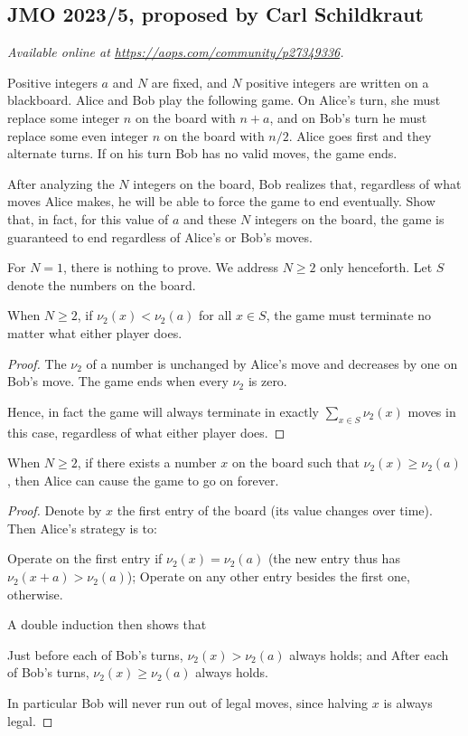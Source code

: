 \documentclass[11pt]{scrartcl}
\begin{document}
\subsection{JMO 2023/5, proposed by Carl Schildkraut}
\textsl{Available online at \url{https://aops.com/community/p27349336}.}
\begin{mdframed}[style=mdpurplebox,frametitle={Problem statement}]
Positive integers $a$ and $N$ are fixed,
and $N$ positive integers are written on a blackboard.
Alice and Bob play the following game.
On Alice's turn, she must replace some integer $n$ on the board with $n+a$,
and on Bob's turn he must replace some even integer $n$ on the board with $n/2$.
Alice goes first and they alternate turns.
If on his turn Bob has no valid moves, the game ends.

After analyzing the $N$ integers on the board, Bob realizes that,
regardless of what moves Alice makes,
he will be able to force the game to end eventually.
Show that, in fact, for this value of $a$ and these $N$ integers on the board,
the game is guaranteed to end regardless of Alice's or Bob's moves.
\end{mdframed}
For $N=1$, there is nothing to prove.
We address $N \ge 2$ only henceforth.
Let $S$ denote the numbers on the board.

\begin{claim*}
  When $N \ge 2$, if $\nu_2(x) < \nu_2(a)$ for all $x \in S$,
  the game must terminate no matter what either player does.
\end{claim*}
\begin{proof}
  The $\nu_2$ of a number is unchanged by Alice's move
  and decreases by one on Bob's move.
  The game ends when every $\nu_2$ is zero.

  Hence, in fact the game will always terminate in exactly
  $\sum_{x \in S} \nu_2(x)$ moves in this case,
  regardless of what either player does.
\end{proof}

\begin{claim*}
  When $N \ge 2$, if there exists a number $x$ on the board such that
  $\nu_2(x) \ge \nu_2(a)$, then Alice can cause the game to go on forever.
\end{claim*}
\begin{proof}
  Denote by $x$ the first entry of the board (its value changes over time).
  Then Alice's strategy is to:
  \begin{itemize}
    \ii Operate on the first entry if $\nu_2(x) = \nu_2(a)$
    (the new entry thus has $\nu_2(x+a) > \nu_2(a)$);
    \ii Operate on any other entry besides the first one, otherwise.
  \end{itemize}
  A double induction then shows that
  \begin{itemize}
    \ii Just before each of Bob's turns, $\nu_2(x) > \nu_2(a)$ always holds; and
    \ii After each of Bob's turns, $\nu_2(x) \ge \nu_2(a)$ always holds.
  \end{itemize}
  In particular Bob will never run out of legal moves,
  since halving $x$ is always legal.
\end{proof}
\pagebreak
\end{document}
